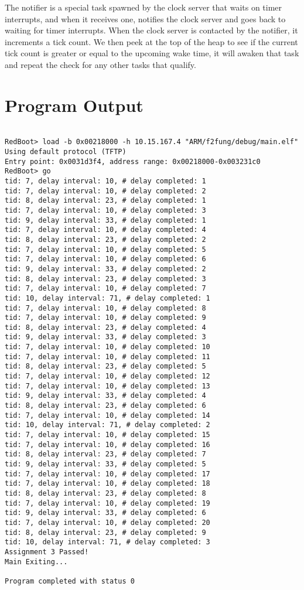 \documentclass[letterpaper]{article}
\begin{document}
The notifier is a special task spawned by the clock server that waits on timer interrupts, and when it receives one, notifies the clock server and goes back to waiting for timer interrupts. When the clock server is contacted by the notifier, it increments a tick count. We then peek at the top of the heap to see if the current tick count is greater or equal to the upcoming wake time, it will awaken that task and repeat the check for any other tasks that qualify.

\section{Program Output}

\begin{verbatim}

RedBoot> load -b 0x00218000 -h 10.15.167.4 "ARM/f2fung/debug/main.elf"
Using default protocol (TFTP)
Entry point: 0x0031d3f4, address range: 0x00218000-0x003231c0
RedBoot> go
tid: 7, delay interval: 10, # delay completed: 1
tid: 7, delay interval: 10, # delay completed: 2
tid: 8, delay interval: 23, # delay completed: 1
tid: 7, delay interval: 10, # delay completed: 3
tid: 9, delay interval: 33, # delay completed: 1
tid: 7, delay interval: 10, # delay completed: 4
tid: 8, delay interval: 23, # delay completed: 2
tid: 7, delay interval: 10, # delay completed: 5
tid: 7, delay interval: 10, # delay completed: 6
tid: 9, delay interval: 33, # delay completed: 2
tid: 8, delay interval: 23, # delay completed: 3
tid: 7, delay interval: 10, # delay completed: 7
tid: 10, delay interval: 71, # delay completed: 1
tid: 7, delay interval: 10, # delay completed: 8
tid: 7, delay interval: 10, # delay completed: 9
tid: 8, delay interval: 23, # delay completed: 4
tid: 9, delay interval: 33, # delay completed: 3
tid: 7, delay interval: 10, # delay completed: 10
tid: 7, delay interval: 10, # delay completed: 11
tid: 8, delay interval: 23, # delay completed: 5
tid: 7, delay interval: 10, # delay completed: 12
tid: 7, delay interval: 10, # delay completed: 13
tid: 9, delay interval: 33, # delay completed: 4
tid: 8, delay interval: 23, # delay completed: 6
tid: 7, delay interval: 10, # delay completed: 14
tid: 10, delay interval: 71, # delay completed: 2
tid: 7, delay interval: 10, # delay completed: 15
tid: 7, delay interval: 10, # delay completed: 16
tid: 8, delay interval: 23, # delay completed: 7
tid: 9, delay interval: 33, # delay completed: 5
tid: 7, delay interval: 10, # delay completed: 17
tid: 7, delay interval: 10, # delay completed: 18
tid: 8, delay interval: 23, # delay completed: 8
tid: 7, delay interval: 10, # delay completed: 19
tid: 9, delay interval: 33, # delay completed: 6
tid: 7, delay interval: 10, # delay completed: 20
tid: 8, delay interval: 23, # delay completed: 9
tid: 10, delay interval: 71, # delay completed: 3
Assignment 3 Passed!
Main Exiting...

Program completed with status 0

\end{verbatim}
\end{document}
